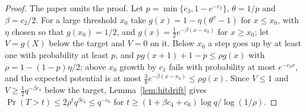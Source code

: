\begin{proof}\leanok
The paper omits the proof. Let $p=\min\{c_3,1-e^{-c_2}\}$, $\theta=1/p$ and
$\beta=c_2/2$. For a large threshold $x_0$ take
$g(x)=1-\eta(\theta^x-1)$ for $x\le x_0$, with $\eta$ chosen so that
$g(x_0)=1/2$, and $g(x)=\tfrac12e^{-\beta(x-x_0)}$ for $x\ge x_0$; let
$V=g(X)$ below the target and $V=0$ on it. Below $x_0$ a step goes up by at
least one with probability at least $p$, and
$pg(x+1)+1-p\le\rho g(x)$ with $\rho=1-(1-p)\eta/2$; above $x_0$ growth by
$c_1$ fails with probability at most $e^{-c_2x}$, and the expected potential is
at most $\tfrac38e^{-\beta(x-x_0)}\le\rho g(x)$. Since $V\le1$ and
$V\ge\tfrac12q^{-\beta c_4}$ below the target, Lemma~\ref{lem:hitdrift} gives
$\Pr(T>t)\le2\rho^tq^{\beta c_4}\le q^{-c_6}$ for
$t\ge(1+\beta c_4+c_6)\log q/\log(1/\rho)$.
\end{proof}


